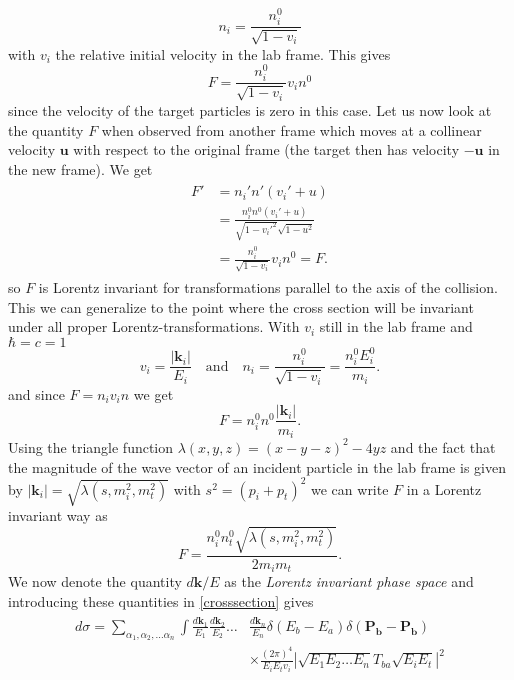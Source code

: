 \documentclass[11pt]{article}
\numberwithin{equation}{section}
\begin{document}
\begin{equation}
	n_i = \frac{n_i^0}{\sqrt{1-v_i}}
\end{equation}
with $v_i$ the relative initial velocity in the lab frame. This gives
\begin{equation}
	F = \frac{n_i^0}{\sqrt{1-v_i}}v_i n^0
\end{equation}
since the velocity of the target particles is zero in this case.
Let us now look at the quantity $F$ when observed from another frame which moves at a collinear velocity $\mathbf{u}$ with respect to the original frame (the target then has velocity $-\mathbf{u}$ in the new frame). We get
\begin{align}
\begin{split}
	F' &= n_i'n'(v_i' + u)\\
	&= \frac{n_i^0 n^0(v_i' + u)}{\sqrt{1-{v_i'}^2}\sqrt{1-u^2}}\\
	&=  \frac{n_i^0}{\sqrt{1-v_i}}v_i n^0 = F.
\end{split}
\end{align}
so $F$ is Lorentz invariant for transformations parallel to the axis of the collision. This we can generalize to the point where the cross section will be invariant under all proper Lorentz-transformations. With $v_i$ still in the lab frame and $\hbar = c = 1$
\begin{equation}
	v_i = \frac{|\mathbf{k}_i|}{E_i} \quad \mbox{and} \quad n_i = \frac{n_i^0}{\sqrt{1-v_i}} = \frac{n_i^0 E_i^0}{m_i}.
\end{equation}
and since $F = n_i v_i n$ we get
\begin{equation}
	F = n_i^0n^0 \frac{|\mathbf{k}_i|}{m_i}.
\end{equation}
Using the triangle function $\lambda(x,y,z) = (x-y-z)^2-4yz$ and the fact that the magnitude of the wave vector of an incident particle in the lab frame is given by $|\mathbf{k}_i| = \sqrt{\lambda(s,m_i^2,m_t^2)}$ with $s^2 = (p_i + p_t)^2$ we can write $F$ in a Lorentz invariant way as
\begin{equation}
	F = \frac{n_i^0n_t^0\sqrt{\lambda(s,m_i^2,m_t^2)}}{2m_im_t}.
\end{equation}
We now denote the quantity $d\mathbf{k}/E$ as the \emph{Lorentz invariant phase space} and introducing these quantities in \eqref{crosssection} gives
\begin{align}\label{finaldifferential}
\begin{split}	
	d\sigma = \underset{\alpha_1, \alpha_2, \ldots \alpha_n} \sum \int \frac{d\mathbf{k}_1}{E_1} \frac{d\mathbf{k}_2}{E_2} \ldots &\frac{d\mathbf{k}_n}{E_n} \delta(E_b-E_a)\delta(\mathbf{P_b} - \mathbf{P_b}) \\&\times \frac{(2\pi)^4}{E_iE_tv_i}|\sqrt{E_1E_2 \ldots E_n}T_{ba}\sqrt{E_iE_t}|^2
\end{split}
\end{align}
\end{document}
